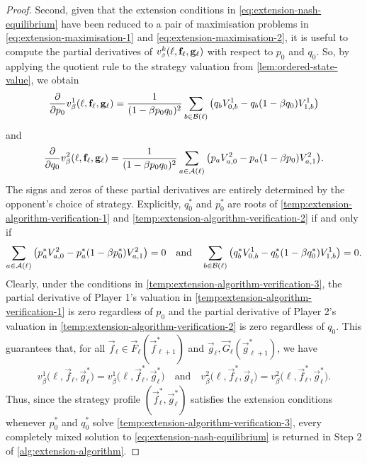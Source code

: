 \begin{proof}
        Second, given that the extension conditions in \eqref{eq:extension-nash-equilibrium} have been reduced to a pair of maximisation problems in \eqref{eq:extension-maximisation-1} and \eqref{eq:extension-maximisation-2}, it is useful to compute the partial derivatives of $v^k_\sbeta(\ell, \vec{f}_\ell, \vec{g}_\ell)$ with respect to $p_0$ and $q_0$.
        So, by applying the quotient rule to the strategy valuation from \autoref{lem:ordered-state-value}, we obtain
        \begin{equation} \label{temp:extension-algorithm-verification-1}
            \frac{\partial}{\partial p_0} v^1_\beta(\ell, \mathbf{f}_\ell, \mathbf{g}_\ell)
                = \frac{1}{(1 - \beta p_0 q_0)^2} \sum_{b \in \mathcal{B}(\ell)}  \big( q_b V^1_{0, b} - q_b (1 - \beta q_0) V^1_{1, b} \big)
        \end{equation}
        and
        \begin{equation} \label{temp:extension-algorithm-verification-2}
            \frac{\partial}{\partial q_0} v^2_\beta(\ell, \mathbf{f}_\ell, \mathbf{g}_\ell)
                = \frac{1}{(1 - \beta p_0 q_0)^2} \sum_{a \in \mathcal{A}(\ell)} \big( p_a V_{a, 0}^2 - p_a (1 - \beta p_0) V_{a, 1}^2 \big).
        \end{equation}
        The signs and zeros of these partial derivatives are entirely determined by the opponent's choice of strategy.
        Explicitly, $q^*_0$ and $p^*_0$ are roots of \eqref{temp:extension-algorithm-verification-1} and \eqref{temp:extension-algorithm-verification-2} if and only if
        \begin{equation} \label{temp:extension-algorithm-verification-3}
            \sum_{a \in \mathcal{A}(\ell)} \big( p^*_a V_{a, 0}^2 - p^*_a (1 - \beta p^*_0) V_{a, 1}^2 \big) = 0
            \quad\text{and}\quad
            \sum_{b \in \mathcal{B}(\ell)}  \big( q^*_b V^1_{0, b} - q^*_b (1 - \beta q^*_0) V^1_{1, b} \big) = 0.
        \end{equation}
        Clearly, under the conditions in \eqref{temp:extension-algorithm-verification-3}, the partial derivative of Player 1's valuation in \eqref{temp:extension-algorithm-verification-1} is zero regardless of $p_0$ and the partial derivative of Player 2's valuation in \eqref{temp:extension-algorithm-verification-2} is zero regardless of $q_0$.
        This guarantees that, for all $\vec{f}_\ell \in \vec{F}_\ell(\vec{f}^*_{\ell + 1})$ and $\vec{g}_\ell, \vec{G}_\ell(\vec{g}^*_{\ell + 1})$, we have
        \begin{equation} \label{temp:extension-algorithm-verification-4}
            v^1_\beta\big(\ell, \vec{f}_\ell, \vec{g}^*_\ell\big)
                = v^1_\beta\big(\ell, \vec{f}^*_\ell, \vec{g}^*_\ell\big)
            \quad\text{and}\quad
            v^2_\beta\big(\ell, \vec{f}^*_\ell, \vec{g}_\ell\big)
                = v^2_\beta\big(\ell, \vec{f}^*_\ell, \vec{g}^*_\ell\big).
        \end{equation}
        Thus, since the strategy profile $(\vec{f}^*_\ell, \vec{g}^*_\ell)$ satisfies the extension conditions whenever $p^*_0$ and $q^*_0$ solve \eqref{temp:extension-algorithm-verification-3}, every completely mixed solution to \eqref{eq:extension-nash-equilibrium} is returned in Step 2 of \autoref{alg:extension-algorithm}.
        

\end{proof}
